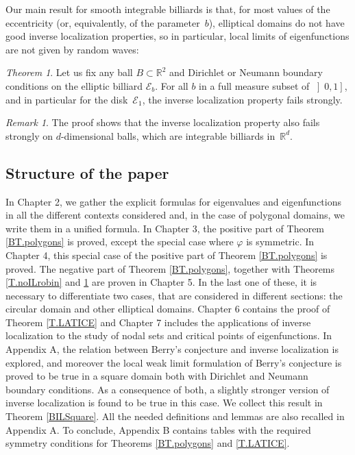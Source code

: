 \documentclass{amsart}
\theoremstyle{definition}
\theoremstyle{remark}
\newtheorem{remark}[theorem]{Remark}
\def\RR{\mathbb{R}}
\numberwithin{equation}{section}
\newcounter{bigthm}
\newtheorem{bigtheorem}[bigthm]{Theorem} %
\theoremstyle{definition}
\theoremstyle{remark}
\def\RR{\mathbb{R}}
\begin{document}
	
Our main result for smooth integrable billiards is that, for most values of the eccentricity (or, equivalently, of the parameter~$b$), elliptical domains do not have good inverse localization properties, so in particular, local limits of eigenfunctions are not given by random waves:

\begin{bigtheorem} \label{T.noILellipses}
	Let us fix any ball $B\subset\RR^2$ and Dirichlet or Neumann boundary conditions on the elliptic billiard $\mathcal E_b$. For all $b$ in a full measure subset of $\left]0,1\right]$, and in particular for the disk~$\mathcal E_1$, the inverse localization property fails strongly. 
	\end{bigtheorem}
	
\begin{remark}\label{R.balldimd}
	The proof shows that the inverse localization property also fails strongly on $d$-dimensional balls, which are integrable billiards in~$\RR^d$. \end{remark}	
	
\subsection{Structure of the paper}
In Chapter 2, we gather the explicit formulas for eigenvalues and eigenfunctions in all the different contexts considered and, in the case of polygonal domains, we write them in a unified formula. In Chapter 3, the positive part of Theorem \ref{BT.polygons} is proved, except the special case where $\varphi$ is symmetric.  In Chapter 4, this special case of the positive part of Theorem \ref{BT.polygons} is proved. The negative part of Theorem \ref{BT.polygons}, together with Theorems \ref{T.noILrobin} and \ref{T.noILellipses} are proven in Chapter 5. In the last one of these, it is necessary to differentiate two cases, that are considered in different sections: the circular domain and other elliptical domains. Chapter 6 contains the proof of Theorem \ref{T.LATICE} and Chapter 7 includes the applications of inverse localization to the study of nodal sets and critical points of eigenfunctions. In Appendix A, the relation between Berry's conjecture and inverse localization is explored, and moreover the local weak limit formulation of Berry's conjecture is proved to be true in a square domain both with Dirichlet and Neumann boundary conditions. As a consequence of both, a slightly stronger version of inverse localization is found to be true in this case. We collect this result in Theorem \ref{BILSquare}. All the needed definitions and lemmas are also recalled in Appendix A. To conclude, Appendix B contains tables with the required symmetry conditions for Theorems \ref{BT.polygons} and \ref{T.LATICE}.
\end{document}
